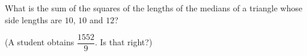 What is the sum of the squares of the lengths of the medians of a triangle whose side lengths are $10$, $10$ and $12$?

(A student obtains $\dfrac{1552}{9}$. Is that right?)
